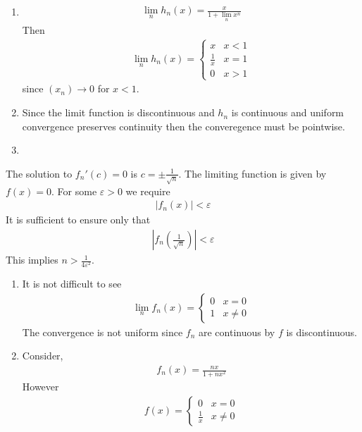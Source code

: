 \begin{enumerate}[label=(\alph*)]
    \item 
    \begin{align*}
        \lim_n h_n(x) = \frac{x}{1+\lim_n x^n}
    \end{align*}
    Then 
    \begin{align*}
        \lim_n h_n(x) = \begin{cases}
            x & x < 1 \\
            \frac{1}{x} & x=1 \\
            0 & x>1
        \end{cases}
    \end{align*}
    since $(x_n)\rightarrow 0$ for $x<1$.

    \item
    Since the limit function is discontinuous and $h_n$ is continuous
    and uniform convergence preserves continuity then the converegence 
    must be pointwise.

    \item

\end{enumerate}


The solution to $f_n'(c)=0$ is $c=\pm \frac{1}{\sqrt n}$.
The limiting function is given by $f(x)=0$. For some $\varepsilon>0$
we require 
\begin{align*}
    |f_n(x)| < \varepsilon
\end{align*}
It is sufficient to ensure only that 
\begin{align*}
    |f_n(\frac{1}{\sqrt n})| < \varepsilon
\end{align*}
This implies $n>\frac{1}{4\varepsilon^2}$.

\begin{enumerate}[label=(\alph*)]
    \item 
    It is not difficult to see 
    \begin{align*}
        \lim_n f_n(x) = \begin{cases}
            0 & x=0 \\
            1 & x\neq 0
        \end{cases}
    \end{align*}
    The convergence is not uniform since $f_n$ are continuous by 
    $f$ is discontinuous.

    \item
    Consider,
    \begin{align*}
        f_n(x) = \frac{n x}{1+n x^2}
    \end{align*}
    However 
    \begin{align*}
        f(x) = \begin{cases}
            0 & x=0 \\
            \frac{1}{x} & x \neq 0
        \end{cases}
    \end{align*}
\end{enumerate}

